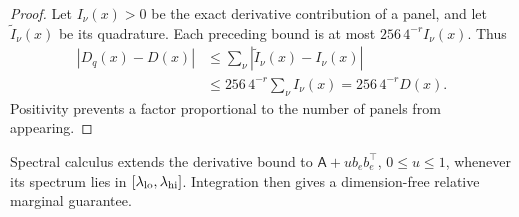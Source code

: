 \documentclass[conference]{IEEEtran}
\theoremstyle{definition}
\newcommand{\matA}{\mathsf A}
\begin{document}
\begin{proof}
Let $I_\nu(x)>0$ be the exact derivative contribution of a panel, and let $\widetilde I_\nu(x)$ be its quadrature. Each preceding bound is at most $256\,4^{-r}I_\nu(x)$. Thus
\begin{align*}
|D_q(x)-D(x)|
&\le\sum_\nu|\widetilde I_\nu(x)-I_\nu(x)|\\
&\le256\,4^{-r}\sum_\nu I_\nu(x)
=256\,4^{-r}D(x).
\end{align*}
Positivity prevents a factor proportional to the number of panels from appearing.
\end{proof}

Spectral calculus extends the derivative bound to
$\matA+u b_eb_e^\top$, $0\le u\le1$, whenever its
spectrum lies in $[\lambda_{\rm lo},\lambda_{\rm hi}]$. Integration then gives
a dimension-free relative marginal guarantee.
\end{document}
